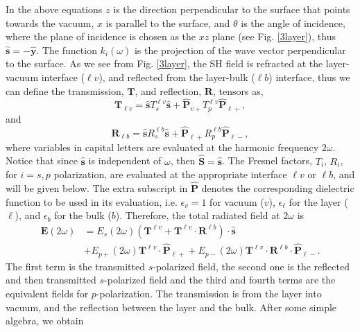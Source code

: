 \documentclass[10pt]{article}
\begin{document}
In the above equations $z$ is the direction perpendicular to the surface that
points towards the vacuum, $x$ is parallel to the surface, and $\theta$ is the
angle of incidence, where the plane of incidence is chosen as the $xz$ plane
(see Fig. \ref{3layer}), thus $\hat{\mathbf{s}}=-\hat{\mathbf{y}}$. The
function $k_i(\omega)$ is the projection of the wave vector perpendicular to
the surface. As we see from Fig. \ref{3layer}, the SH field is refracted at the
layer-vacuum interface ($\ell v$), and reflected from the layer-bulk ($\ell b$)
interface, thus we can define the transmission, $\mathbf{T}$, and reflection,
$\mathbf{R}$, tensors as,
\begin{equation}\label{r5}
\mathbf{T}_{\ell v}
= \hat{\mathbf{s}}T_s^{\ell v}\hat{\mathbf{s}} 
+ \hat{\mathbf{P}}_{v+}T_{p}^{\ell v} \hat{\mathbf{P}}_{\ell +},
\end{equation}
and
\begin{equation}\label{r6}
\mathbf{R}_{\ell b}
= \hat{\mathbf{s}}R_s^{\ell b}\hat{\mathbf{s}}
+ \hat{\mathbf{P}}_{\ell +}R_{p}^{\ell b} \hat{\mathbf{P}}_{\ell -},
\end{equation}
where variables in capital letters are evaluated at the harmonic frequency
$2\omega$. Notice that since $\hat{\mathbf{s}}$ is independent of $\omega$,
then $\hat{\mathbf{S}}=\hat{\mathbf{s}}$. The Fresnel factors, $T_i$, $R_i$,
for $i=s,p$ polarization, are evaluated at the appropriate interface $\ell v$
or $\ell b$, and will be given below. The extra subscript in $\hat{\mathbf{P}}$
denotes the corresponding dielectric function to be used in its evaluation,
i.e. $\epsilon_v=1$ for vacuum ($v$), $\epsilon_{\ell}$ for the layer ($\ell$),
and $\epsilon_{b}$ for the bulk ($b$). Therefore, the total radiated field at
$2\omega$ is
\begin{align}\label{r7}
\mathbf{E}(2\omega)
&= E_s(2\omega)
\left(
\mathbf{T}^{\ell v} + \mathbf{T}^{\ell v}\cdot\mathbf{R}^{\ell b}
\right)
\cdot\hat{\mathbf{s}}\nonumber\\
&+ E_{p+}(2\omega)\mathbf{T}^{\ell v}\cdot\hat{\mathbf{P}}_{\ell +}
 + E_{p-}(2\omega)\mathbf{T}^{\ell v}
\cdot\mathbf{R}^{\ell b}\cdot\hat{\mathbf{P}}_{\ell-}.
\end{align}
The first term is  the transmitted $s$-polarized field, the second one is the
reflected and then transmitted $s$-polarized field and the third and fourth
terms are the equivalent fields for $p$-polarization. The transmission is from
the layer into vacuum, and the reflection between the layer and the bulk. After
some simple algebra, we obtain
\end{document}
